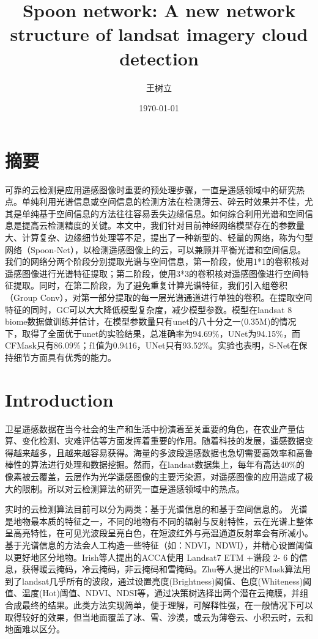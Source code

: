 \documentclass[UTF8]{ctexart}
\begin{document}
\title{Spoon network: A new network structure of landsat imagery cloud detection}
\author{王树立}
\date{\today}

\maketitle
\section*{摘要}
可靠的云检测是应用遥感图像时重要的预处理步骤，一直是遥感领域中的研究热点。单纯利用光谱信息或空间信息的检测方法在检测薄云、碎云时效果并不佳，尤其是单纯基于空间信息的方法往往容易丢失边缘信息。如何综合利用光谱和空间信息是提高云检测精度的关键。本文中，我们针对目前神经网络模型存在的参数量大、计算复杂、边缘细节处理等不足，提出了一种新型的、轻量的网络，称为勺型网络（Spoon-Net），以检测遥感图像上的云，可以兼顾并平衡光谱和空间信息。我们的网络分两个阶段分别提取光谱与空间信息，第一阶段，使用1*1的卷积核对遥感图像进行光谱特征提取；第二阶段，使用3*3的卷积核对遥感图像进行空间特征提取。同时，在第二阶段，为了避免重复计算光谱特征，我们引入组卷积（Group Conv），对第一部分提取的每一层光谱通道进行单独的卷积。在提取空间特征的同时，GC可以大大降低模型复杂度，减少模型参数。模型在landsat 8 biome数据做训练并估计，在模型参数量只有unet的八十分之一(0.35M)的情况下，取得了全面优于unet的实验结果，总准确率为94.69\%，UNet为94.15\%，而CFMask只有86.09\%；f1值为0.9416，UNet只有93.52\%。实验也表明，S-Net在保持细节方面具有优秀的能力。


\section[]{Introduction}
卫星遥感数据在当今社会的生产和生活中扮演着至关重要的角色，在农业产量估算\cite{prasad2006crop}、变化检测\cite{verbesselt2010detecting}、灾难评估\cite{joyce2009review}等方面发挥着重要的作用。随着科技的发展，遥感数据变得越来越多，且越来越容易获得。海量的多波段遥感数据也急切需要高效率和高鲁棒性的算法进行处理和数据挖掘。然而，在landsat数据集上，每年有高达40\%的像素被云覆盖\cite{ju2008availability}，云层作为光学遥感图像的主要污染源，对遥感图像的应用造成了极大的限制。所以对云检测算法的研究一直是遥感领域中的热点。

实时的云检测算法目前可以分为两类：基于光谱信息的和基于空间信息的。
光谱是地物最本质的特征之一，不同的地物有不同的辐射与反射特性，云在光谱上整体呈高亮特性，在可见光波段呈亮白色，在短波红外与亮温通道反射率会有所减小。基于光谱信息的方法\cite{sun2018cloud}会人工构造一些特征（如：NDVI，NDWI），并精心设置阈值以更好地区分地物。Irish等人\cite{irish2006characterization}提出的ACCA使用 Landsat7 ETM +谱段 2- 6 的信息，获得暖云掩码，冷云掩码，非云掩码和雪掩码。Zhu等人提出的FMask算法\cite{zhu2012object}用到了landsat几乎所有的波段，通过设置亮度(Brightness)阈值、色度(Whiteness)阈值、温度(Hot)阈值、NDVI、NDSI等，通过决策树选择出两个潜在云掩膜，并组合成最终的结果。此类方法实现简单，便于理解，可解释性强，在一般情况下可以取得较好的效果，但当地面覆盖了冰、雪、沙漠，或云为薄卷云、小积云时，云和地面难以区分。
\end{document}
